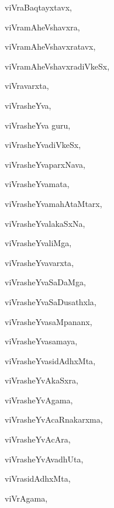 \begin{multicols}{3}
{\noindent
{viVraBaqtayxtavx}, \pageref{viVraBaqtayxtavx}

\noindent
{viVramAheVshavxra}, \pageref{viVramAheVshavxra}

\noindent
{viVramAheVshavxratavx}, \pageref{viVramAheVshavxratavx}

\noindent
{viVramAheVshavxradiVkeSx}, \pageref{viVramAheVshavxradiVkeSx}

\noindent
{viVravarxta}, \pageref{viVravarxta}

\noindent
{viVrasheYva}, \pageref{viVrasheYva}

\noindent
{viVrasheYva guru}, \pageref{viVrasheYvaguru}

\noindent
{viVrasheYvadiVkeSx}, \pageref{viVrasheYvadiVkeSx}

\noindent
{viVrasheYvaparxNava}, \pageref{viVrasheYvaparxNava}

\noindent
{viVrasheYvamata}, \pageref{viVrasheYvamata}

\noindent
{viVrasheYvamahAtaMtarx}, \pageref{viVrasheYvamahAtaMtarx}

\noindent
{viVrasheYvalakaSxNa}, \pageref{viVrasheYvalakaSxNa}

\noindent
{viVrasheYvaliMga}, \pageref{viVrasheYvaliMga}

\noindent
{viVrasheYvavarxta}, \pageref{viVrasheYvavarxta}

\noindent
{viVrasheYvaSaDaMga}, \pageref{viVrasheYvaSaDaMga}

\noindent
{viVrasheYvaSaDusathxla}, \pageref{viVrasheYvaSaDusathxla}

\noindent
{viVrasheYvasaMpananx}, \pageref{viVrasheYvasaMpananx}

\noindent
{viVrasheYvasamaya}, \pageref{viVrasheYvasamaya}

\noindent
{viVrasheYvasidAdhxMta}, \pageref{viVrasheYvasidAdhxMta}

\noindent
{viVrasheYvAkaSxra}, \pageref{viVrasheYvAkaSxra}

\noindent
{viVrasheYvAgama}, \pageref{viVrasheYvAgama}

\noindent
{viVrasheYvAcaRnakarxma}, \pageref{viVrasheYvAcaRnakarxma}

\noindent
{viVrasheYvAcAra}, \pageref{viVrasheYvAcAra}

\noindent
{viVrasheYvAvadhUta}, \pageref{viVrasheYvAvadhUta}

\noindent
{viVrasidAdhxMta}, \pageref{viVrasidAdhxMta}

\noindent
{viVrAgama}, \pageref{viVrAgama}

}
\end{multicols}
